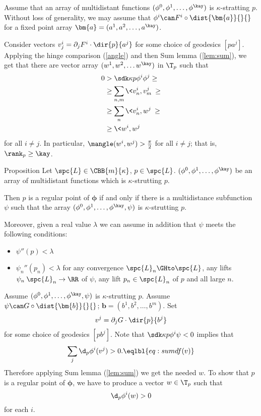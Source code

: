 Assume that 
an array of multidistant functions $(\phi^0,\phi^1,\dots,\phi^\kay)$ is $\kappa$-stratting $p$.
Without loss of generality, we may assume that 
$\phi^i\can F^i\circ\dist{\bm{a}}{}{}$ for a fixed point array $\bm{a}=(a^1,a^2,\dots,a^\kay)$.

Consider vectors $v^i_j=\partial_jF^i\cdot\dir{p}{a^j}$ for some choice of geodesics $[pa^j]$.
Applying the hinge comparison (\ref{angle})
and then Sum lemma (\ref{lem:sum}), 
we get that there are vector array 
$(w^1,w^2,\dots w^\kay)$  in $\T_p$
such that 
\begin{align*}
0&>\sdk\kappa{p}{\phi^i}{\phi^j}
\ge
\\
&\ge\sum_{n,m}\<v^i_n,v^j_m\>\ge
\\
&\ge\sum_n\<v^i_n,w^j\>\ge
\\
&\ge\<w^i,w^j\>
\end{align*}
for all $i\ne j$.
In particular, $\mangle(w^i,w^j)>\tfrac\pi2$ for all $i\ne j$;
that is, $\rank_p\ge \kay$.
\qeds



\begin{thm}{Proposition}\label{prop:regular=+1}
Let $\spc{L}\in\CBB{m}{\kappa}$, 
$p\in  \spc{L}$.
$(\phi^0,\phi^1,\dots,\phi^\kay)$
be an array of multidistant functions which is $\kappa$-strutting $p$.

Then $p$ is a regular point of $\bm{\phi}$ if and only if there is a multidistance subfunction $\psi$ such that 
the array 
$(\phi^0,\phi^1,\dots,\phi^\kay,\psi)$ 
is $\kappa$-strutting $p$.

Moreover, given a real value $\lambda$
we can assume in addition that $\psi$ meets the following conditions:
\begin{itemize}
\item $\psi''(p)< \lambda$
\item $\psi_n''(p_n)< \lambda$ for 
any convergence $\spc{L}_n\GHto\spc{L}$,
any lifts $\psi_n\:\spc{L}_n\to\RR$ of $\psi$,
any lift $p_n\in \spc{L}_n$ of $p$
and all large $n$.
\end{itemize}
\end{thm}



Assume $(\phi^0,\phi^1,\dots,\phi^\kay,\psi)$ is $\kappa$-strutting $p$.
Assume $\psi\can G\circ\dist{\bm{b}}{}{}$;
$\bm{b}=(b^1,b^2,\dots,b^m)$.
Set 
\[v^j=\partial_jG\cdot \dir{p}{b^j}\] 
for some choice of geodesics $[p b^j]$.
Note that $\sdk\kappa p{\phi^i}\psi<0$ implies that
\[\sum_j\d_p\phi^i(v^j)>0.
\eqlbl{eq:sum df(v)}
\]
Therefore applying Sum lemma (\ref{lem:sum})
we get the needed $w$.
 To show that $p$ is a regular point of $\bm{\phi}$,
we have to produce a vector $w\in\T_p$ such that 
\[\d_p\phi^i(w)>0\] 
for each $i$.

